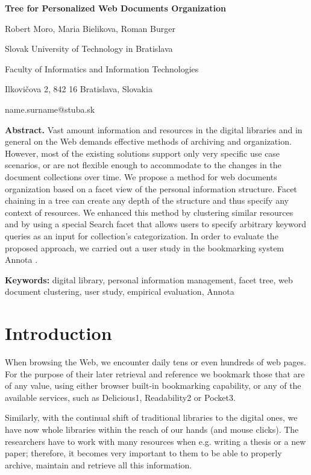\documentclass{article}
\begin{document}
\usepackage{graphicx}

\textbf{ Tree for Personalized Web Documents Organization}
  
 \begin{center}
 
  
  Robert Moro, Maria Bielikova, Roman Burger 
 
 Slovak University of Technology in Bratislava

 Faculty of Informatics and Information Technologies
 
  Ilkovičova 2, 842 16 Bratislava, Slovakia 
  
  name.surname@stuba.sk
  \end{center}
  
 \textbf{Abstract.} Vast amount information and resources in the digital libraries and in general on the Web demands effective methods of archiving and organization. However, most of the existing solutions support only very specific use case scenarios, or are not flexible enough to accommodate to the changes in the document collections over time. We propose a method for web documents organization based on a facet view of the personal information structure. Facet chaining in a tree can create any depth of the structure and thus specify any context of resources. We enhanced this method by clustering similar resources and by using a special Search facet that allows users to specify arbitrary keyword queries as an input for collection’s categorization. In order to evaluate the proposed approach, we carried out a user study in the bookmarking system Annota .
 

 
 \textbf {Keywords:} digital library, personal information management, facet tree, web document clustering, user study, empirical evaluation, Annota 
 
 \section {Introduction}
 
 When browsing the Web, we encounter daily tens or even hundreds of web pages. For the purpose of their later retrieval and reference we bookmark those that are of any value, using either browser built-in bookmarking capability, or any of the available services, such as Delicious1, Readability2 or Pocket3. 


Similarly, with the continual shift of traditional libraries to the digital ones, we have now whole libraries within the reach of our hands (and mouse clicks). The researchers have to work with many resources when e.g. writing a thesis or a new paper; therefore, it becomes very important to them to be able to properly archive, maintain and retrieve all this information. 
\end{document}
